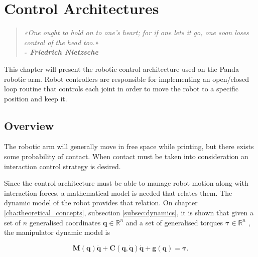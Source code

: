 \chapter{Control Architectures}
\label{cha:control_architectures}

\begin{quotation}
\begin{flushright}
\itshape
«One ought to hold on to one's heart; for if one lets it go, one soon loses control of the head too.»\\
\textbf{- Friedrich Nietzsche}
\end{flushright}
\end{quotation}

This chapter will present the robotic control architecture used on the Panda robotic arm. Robot controllers are responsible for implementing an open/closed loop routine that controls each joint in order to move the robot to a specific position and keep it.


\section{Overview}
\label{sec:control_architectures_overview}

The robotic arm will generally move in free space while printing, but there exists some probability of contact. When contact must be taken into consideration an interaction control strategy is desired.

Since the control architecture must be able to manage robot motion along with interaction forces, a mathematical model is needed that relates them. The dynamic model of the robot provides that relation. On chapter \ref{cha:theoretical_concepts}, subsection \ref{subsec:dynamics}, it is shown that given a set of $n$ generalised coordinates $\boldsymbol{q} \in \mathbb{R}^n$ and a set of generalised torques $\boldsymbol{\tau} \in \mathbb{R}^n$
, the manipulator
dynamic model is

\begin{equation}
    \label{eq:robot_dynamic_model}
    \boldsymbol{M}(\boldsymbol{q})\ddot{\boldsymbol{q}} + \boldsymbol{C}(\boldsymbol{q}, \dot{\boldsymbol{q}})\dot{\boldsymbol{q}} + \boldsymbol{g}(\boldsymbol{q}) = \boldsymbol{\tau}.
\end{equation}

